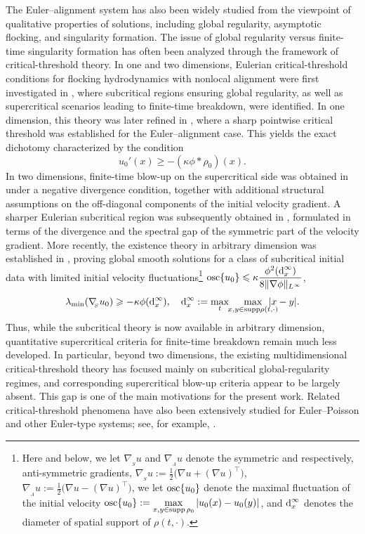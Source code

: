 \documentclass[11pt]{amsart}
\numberwithin{equation}{section}
\theoremstyle{definition}
\theoremstyle{remark}
\numberwithin{equation}{section}
\newcommand{\rd}{\textnormal{d}}
\newcommand{\supp}{{\rm supp}}
\newcommand{\nabS}{\nabla_{\!\!{}_S}}
\newcommand{\nabA}{\nabla_{\!\!{}_A}}
\newcommand{\lamin}{\lambda_{\textnormal{min}}}
\renewcommand{\geq}{\geqslant}
\renewcommand{\ge}{\geqslant}
\renewcommand{\leq}{\leqslant}
\begin{document}
The Euler--alignment system has also been widely studied from the viewpoint of qualitative properties of solutions, including global regularity, asymptotic flocking, and singularity formation. The issue of global regularity versus finite-time singularity formation has often been analyzed through the framework of critical-threshold theory. In one and two dimensions, Eulerian critical-threshold conditions for flocking hydrodynamics with nonlocal alignment were first investigated in \cite{TT14}, where subcritical regions ensuring global regularity, as well as supercritical scenarios leading to finite-time breakdown, were identified. In one dimension, this theory was later refined in \cite{CCTT16}, where a sharp pointwise critical threshold was established for the Euler--alignment case. This yields the exact dichotomy characterized by the condition
\[
u_0'(x)\ge -(\kappa \phi * \rho_0)(x).
\]
In two dimensions, finite-time blow-up on the supercritical side was obtained in \cite{TT14} under a negative divergence condition, together with additional structural assumptions on the off-diagonal components of the initial velocity gradient. A sharper Eulerian subcritical region was subsequently obtained in \cite{HT17}, formulated in terms of the divergence and the spectral gap of the symmetric part of the velocity gradient. More recently, the existence theory in arbitrary dimension was established in \cite{Tad26}, proving global smooth solutions for a class of subcritical initial data with limited initial velocity fluctuations\footnote{Here and below, we let $\nabS u$ and $\nabA u$ denote the symmetric and respectively, anti-symmetric gradients, $\nabS u:=\frac{1}{2}(\nabla u+(\nabla u)^\top\big)$,  $\nabA u:=\frac{1}{2}(\nabla u-(\nabla u)^\top\big)$, we let  $\textnormal{osc} \{u_0\}$  denote the maximal fluctuation of the initial velocity $\displaystyle\textnormal{osc} \{u_0\} :=\max_{x,y\in \supp\,\rho_0}|u_0(x)-u_0(y)|$, and $\rd^\infty_x$ denotes the diameter of spatial support of $\rho(t,\cdot)$.} $\displaystyle\textnormal{osc} \{u_0\}\leq \kappa\frac{\phi^2(\rd^\infty_x)}{8\|\nabla\phi\|_{L^\infty}}$, 
\begin{equation}\label{eq:Eulerian-CT}
\lamin(\nabS u_0) \geq -\kappa\phi(\rd^\infty_x), \quad \rd^\infty_x:=\max_t \hspace*{-0.1cm}\max_{x,y\in \supp \rho(t,\cdot)}\hspace*{-0.4cm}|x-y|.
\end{equation}
Thus, while the subcritical theory is now available in arbitrary dimension, quantitative supercritical criteria for finite-time breakdown remain much less developed. In particular, beyond two dimensions, the existing multidimensional critical-threshold theory has focused mainly on subcritical global-regularity regimes, and corresponding supercritical blow-up criteria appear to be largely absent. This gap is one of the main motivations for the present work. Related critical-threshold phenomena have also been extensively studied for Euler--Poisson and other Euler-type systems; see, for example, \cite{BLT23, CCZ16, CT08, ELT01, LT02, LT03, LTW10, TT22, TW08, WTB12}.
\end{document}

